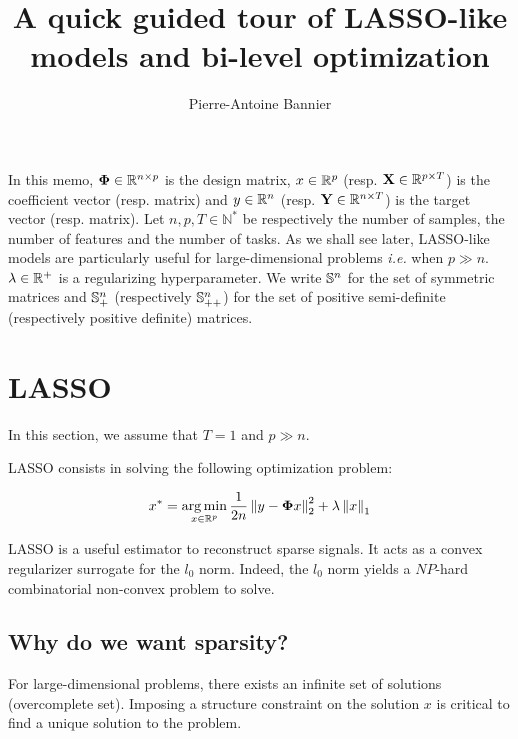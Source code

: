\documentclass[a4paper,10pt]{article}
\author{Pierre-Antoine Bannier}
\title{A quick guided tour of LASSO-like models and bi-level optimization}
\theoremstyle{definition}
\begin{document}
\maketitle

\vskip 0.3in

In this memo, $\mathbf{\Phi} \in \mathbb{R}^{n \times p}$ is the design matrix, $x \in \mathbb{R}^{p}$ (resp. $\mathbf{X} \in \mathbb{R}^{p \times T}$) is the coefficient vector (resp. matrix) and $y \in \mathbb{R}^n$
(resp. $\mathbf{Y} \in \mathbb{R}^{n \times T}$) is the target vector (resp. matrix). Let $n, p, T \in \mathbb{N}^*$ be respectively the number of samples, the number of features and the number of tasks. As we shall see later, LASSO-like models
are particularly useful for large-dimensional problems \textit{i.e.} when $p \gg n$. $\lambda \in \mathbb{R}^+$ is a regularizing hyperparameter. We write $\mathbb{S}^n$ for the set of symmetric matrices and $\mathbb{S}^n_+$ (respectively $\mathbb{S}^n_{++}$) for
the set of positive semi-definite (respectively positive definite) matrices.

\section{LASSO}
\label{section_1}

In this section, we assume that $T = 1$ and $p \gg n$.

\vskip 0.2in

LASSO consists in solving the following optimization problem:

\begin{equation*}
    x^* = \operatorname*{arg\,min}_{x \in \mathbb{R}^{p}} \frac{1}{2n}\left \lVert  y - \mathbf{\Phi} x \right \rVert_2^2 + \lambda \left \lVert  x \right \rVert_{1}
\end{equation*}

\vskip 0.1in

LASSO is a useful estimator to reconstruct sparse signals. It acts as a convex regularizer surrogate for the $l_0$ norm. Indeed, the
$l_0$ norm yields a $NP$-hard combinatorial non-convex problem to solve. \\

\subsection*{Why do we want sparsity?}

For large-dimensional problems, there exists an infinite set of solutions (overcomplete set).
Imposing a structure constraint on the solution $x$ is critical to find a unique solution to the problem.
\end{document}

